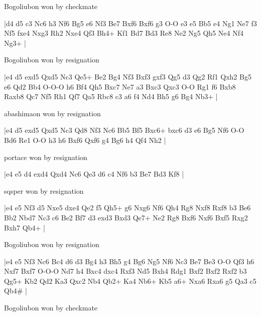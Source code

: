 \showboard

Bogoliubon won by checkmate

\makegametitle
|d4 d5 c3 Nc6 h3 Nf6 Bg5 e6 Nf3 Be7 Bxf6 Bxf6 g3 O-O e3 e5 Bb5 e4 Ng1 Ne7 f3 Nf5 fxe4 Nxg3 Rh2 Nxe4 Qf3 Bh4+ Kf1 Bd7 Bd3 Re8 Ne2 Ng5 Qh5 Ne4 Nf4 Ng3+  |

\showboard

Bogoliubon won by resignation

\makegametitle
|e4 d5 exd5 Qxd5 Nc3 Qe5+ Be2 Bg4 Nf3 Bxf3 gxf3 Qg5 d3 Qg2 Rf1 Qxh2 Bg5 e6 Qd2 Bb4 O-O-O h6 Bf4 Qh5 Bxc7 Ne7 a3 Bxc3 Qxc3 O-O Rg1 f6 Bxb8 Raxb8 Qc7 Nf5 Rh1 Qf7 Qa5 Rbc8 c3 a6 f4 Nd4 Bh5 g6 Bg4 Nb3+  |

\showboard

abashimaon won by resignation

\makegametitle
|e4 d5 exd5 Qxd5 Nc3 Qd8 Nf3 Nc6 Bb5 Bf5 Bxc6+ bxc6 d3 e6 Bg5 Nf6 O-O Bd6 Re1 O-O h3 h6 Bxf6 Qxf6 g4 Bg6 h4 Qf4 Nh2  |

\showboard

portace won by resignation

\makegametitle
|e4 e5 d4 exd4 Qxd4 Nc6 Qe3 d6 c4 Nf6 b3 Be7 Bd3 Kf8  |

\showboard

sqsper won by resignation

\makegametitle
|e4 e5 Nf3 d5 Nxe5 dxe4 Qe2 f5 Qh5+ g6 Nxg6 Nf6 Qh4 Rg8 Nxf8 Rxf8 b3 Be6 Bb2 Nbd7 Nc3 c6 Be2 Bf7 d3 exd3 Bxd3 Qe7+ Ne2 Rg8 Bxf6 Nxf6 Bxf5 Rxg2 Bxh7 Qb4+  |

\showboard

Bogoliubon won by resignation

\makegametitle
|e4 e5 Nf3 Nc6 Bc4 d6 d3 Bg4 h3 Bh5 g4 Bg6 Ng5 Nf6 Nc3 Be7 Be3 O-O Qf3 h6 Nxf7 Bxf7 O-O-O Nd7 h4 Bxc4 dxc4 Rxf3 Nd5 Bxh4 Rdg1 Bxf2 Bxf2 Rxf2 b3 Qg5+ Kb2 Qd2 Ka3 Qxc2 Nb4 Qb2+ Ka4 Nb6+ Kb5 a6+ Nxa6 Rxa6 g5 Qa3 c5 Qb4\#  |

\showboard

Bogoliubon won by checkmate

